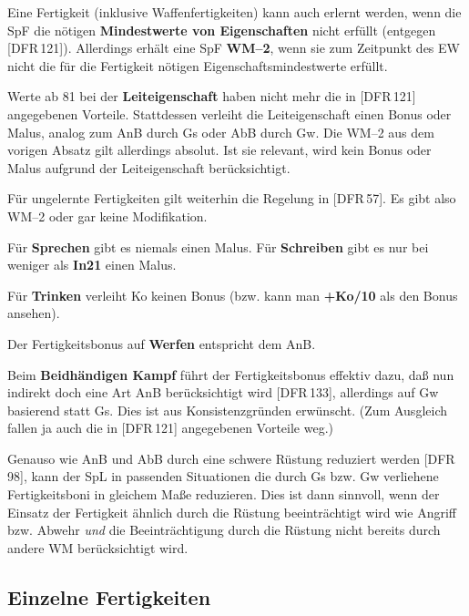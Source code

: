 \documentclass[10pt,a4paper,germanpar]{article}
\begin{document}
Eine Fertigkeit (inklusive Waffenfertigkeiten) kann auch erlernt
werden, wenn die SpF die nötigen \textbf{Mindestwerte von
  Eigenschaften} nicht erfüllt (entgegen [DFR\,121]). Allerdings
erhält eine SpF \textbf{WM--2}, wenn sie zum Zeitpunkt des EW nicht
die für die Fertigkeit nötigen Eigenschaftsmindestwerte erfüllt.

Werte ab 81 bei der \textbf{Leiteigenschaft} haben nicht mehr die in
[DFR\,121] angegebenen Vorteile. Stattdessen verleiht die
Leiteigenschaft einen Bonus oder Malus, analog zum AnB durch Gs oder
AbB durch Gw. Die WM--2 aus dem vorigen Absatz gilt allerdings
absolut. Ist sie relevant, wird kein Bonus oder Malus aufgrund der
Leiteigenschaft berücksichtigt.

Für ungelernte Fertigkeiten gilt weiterhin die Regelung in
[DFR\,57]. Es gibt also WM--2 oder gar keine Modifikation.

Für \textbf{Sprechen} gibt es niemals einen Malus. Für
\textbf{Schreiben} gibt es nur bei weniger als \textbf{In21} einen
Malus.

Für \textbf{Trinken} verleiht Ko keinen Bonus (bzw. kann man
\textbf{+Ko/10} als den Bonus ansehen).

Der Fertigkeitsbonus auf \textbf{Werfen} entspricht dem AnB.

Beim \textbf{Beidhändigen Kampf} führt der Fertigkeitsbonus effektiv
dazu, daß nun indirekt doch eine Art AnB berücksichtigt wird
[DFR\,133], allerdings auf Gw basierend statt Gs. Dies ist aus
Konsistenzgründen erwünscht. (Zum Ausgleich fallen ja auch die in
[DFR\,121] angegebenen Vorteile weg.)

Genauso wie AnB und AbB durch eine schwere Rüstung reduziert werden
[DFR\,98], kann der SpL in passenden Situationen die durch Gs bzw. Gw
verliehene Fertigkeitsboni in gleichem Maße reduzieren. Dies ist dann
sinnvoll, wenn der Einsatz der Fertigkeit ähnlich durch die Rüstung
beeinträchtigt wird wie Angriff bzw. Abwehr \emph{und} die
Beeinträchtigung durch die Rüstung nicht bereits durch andere WM
berücksichtigt wird.

\subsection{Einzelne Fertigkeiten}
\end{document}

